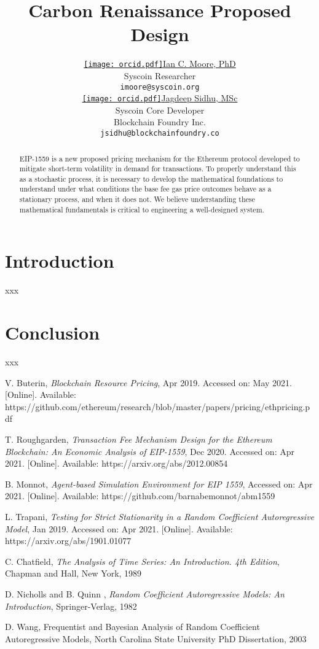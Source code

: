 \documentclass{article}
\title{Carbon Renaissance Proposed Design}
\author{ \href{https://orcid.org/0000-0000-0000-0000}{\texttt{[image: orcid.pdf]}\hspace{1mm}Ian C. Moore, PhD}\\
	Syscoin Researcher\\
	\texttt{imoore@syscoin.org} \\
	\And
	\href{https://orcid.org/0000-0000-0000-0000}{\texttt{[image: orcid.pdf]}\hspace{1mm}Jagdeep Sidhu, MSc} \\
	Syscoin Core Developer\\
	Blockchain Foundry Inc.\\
	\texttt{jsidhu@blockchainfoundry.co} \\
}
\begin{document}
\maketitle

\begin{abstract}
EIP-1559 is a new proposed pricing mechanism for the Ethereum protocol developed to mitigate short-term volatility in demand for transactions. To properly understand this as a stochastic process, it is necessary to develop the mathematical foundations to understand under what conditions the base fee gas price outcomes behave as a stationary process, and when it does not. We believe understanding these mathematical fundamentals is critical to engineering a well-designed system.
\end{abstract}


\section{Introduction}
xxx




\section{Conclusion}
\label{section:conclusion}

xxx

\begin{thebibliography}{1}

 V. Buterin,  \textit{Blockchain Resource Pricing}, Apr 2019. Accessed on: May 2021. [Online]. Available: https://github.com/ethereum/research/blob/master/papers/pricing/ethpricing.pdf

 T. Roughgarden, \textit{Transaction Fee Mechanism Design for the Ethereum Blockchain: An Economic Analysis of EIP-1559}, Dec 2020. Accessed on: Apr 2021. [Online]. Available: https://arxiv.org/abs/2012.00854

 B. Monnot, \textit{Agent-based Simulation Environment for EIP 1559}, Accessed on: Apr 2021.  [Online]. Available:  https://github.com/barnabemonnot/abm1559

 L. Trapani, \textit{Testing for Strict Stationarity in a Random Coefficient Autoregressive Model}, Jan 2019. Accessed on: Apr 2021. [Online]. Available: https://arxiv.org/abs/1901.01077

 C. Chatfield, \textit{The Analysis of Time Series: An Introduction. 4th Edition}, Chapman and Hall, New York, 1989

 D. Nicholls and B. Quinn , \textit{Random Coefficient Autoregressive Models: An Introduction}, Springer-Verlag, 1982

 D. Wang, Frequentist and Bayesian Analysis of Random Coefficient Autoregressive Models, North Carolina State University PhD Dissertation, 2003



\end{thebibliography}
\end{document}

